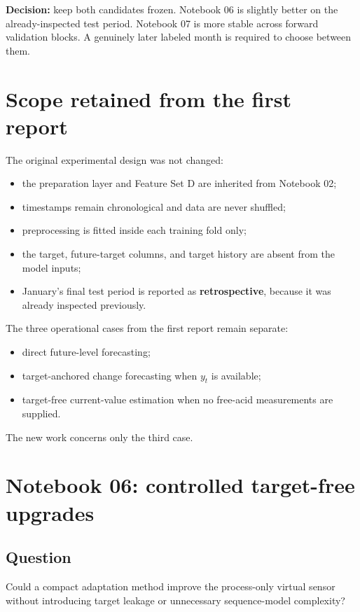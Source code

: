 \documentclass[10pt,a4paper]{article}
\newcommand{\statusbox}[1]{\colorbox{Light}{\parbox{0.96\linewidth}{#1}}
}
\begin{document}
\statusbox{\textbf{Decision:} keep both candidates frozen. Notebook 06 is slightly better on the already-inspected test period. Notebook 07 is more stable across forward validation blocks. A genuinely later labeled month is required to choose between them.}

\section{Scope retained from the first report}

The original experimental design was not changed:
\begin{itemize}
  \item the preparation layer and Feature Set D are inherited from Notebook 02;
  \item timestamps remain chronological and data are never shuffled;
  \item preprocessing is fitted inside each training fold only;
  \item the target, future-target columns, and target history are absent from the model inputs;
  \item January's final test period is reported as \textbf{retrospective}, because it was already inspected previously.
\end{itemize}

The three operational cases from the first report remain separate:
\begin{itemize}
  \item direct future-level forecasting;
  \item target-anchored change forecasting when $y_t$ is available;
  \item target-free current-value estimation when no free-acid measurements are supplied.
\end{itemize}

The new work concerns only the third case.

\section{Notebook 06: controlled target-free upgrades}

\subsection*{Question}

Could a compact adaptation method improve the process-only virtual sensor without introducing target leakage or unnecessary sequence-model complexity?
\end{document}
